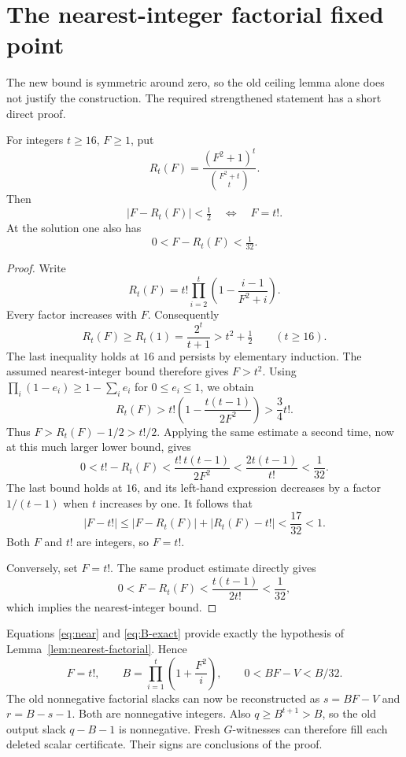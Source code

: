 \section{The nearest-integer factorial fixed point}

The new bound is symmetric around zero, so the old ceiling lemma alone
does not justify the construction. The required strengthened statement
has a short direct proof.

\begin{lemma}\label{lem:nearest-factorial}
For integers \(t\ge16\), \(F\ge1\), put
\[
 R_t(F)=\frac{(F^2+1)^t}{\binom{F^2+t}{t}}.
\]
Then
\[
 |F-R_t(F)|<\tfrac12\quad\Longleftrightarrow\quad F=t!.
\]
At the solution one also has
\[
 0<F-R_t(F)<\tfrac1{32}.
\]
\end{lemma}

\begin{proof}
Write
\[
 R_t(F)=t!\prod_{i=2}^t
       \left(1-\frac{i-1}{F^2+i}\right).
\]
Every factor increases with \(F\). Consequently
\[
 R_t(F)\ge R_t(1)=\frac{2^t}{t+1}>t^2+\tfrac12
       \qquad(t\ge16).
\]
The last inequality holds at \(16\) and persists by elementary
induction. The assumed nearest-integer bound therefore gives \(F>t^2\).
Using \(\prod_i(1-e_i)\ge1-\sum_i e_i\) for \(0\le e_i\le1\),
we obtain
\[
 R_t(F)>
 t!\left(1-\frac{t(t-1)}{2F^2}\right)>\frac34t!.
\]
Thus \(F>R_t(F)-1/2>t!/2\). Applying the same estimate a second
time, now at this much larger lower bound, gives
\[
 0<t!-R_t(F)<\frac{t!\,t(t-1)}{2F^2}
                 <\frac{2t(t-1)}{t!}<\frac1{32}.
\]
The last bound holds at \(16\), and its left-hand expression decreases
by a factor \(1/(t-1)\) when \(t\) increases by one.
It follows that
\[
 |F-t!|\le |F-R_t(F)|+|R_t(F)-t!|<\frac{17}{32}<1.
\]
Both \(F\) and \(t!\) are integers, so \(F=t!\).

Conversely, set \(F=t!\). The same product estimate directly gives
\[
 0<F-R_t(F)<\frac{t(t-1)}{2t!}<\frac1{32},
\]
which implies the nearest-integer bound.
\end{proof}

Equations \eqref{eq:near} and \eqref{eq:B-exact} provide exactly
the hypothesis of Lemma~\ref{lem:nearest-factorial}. Hence
\begin{equation}\label{eq:factorial-recovered}
 F=t!,\qquad
 B=\prod_{i=1}^t\left(1+\frac{F^2}{i}\right),\qquad
 0<BF-V<B/32.
\end{equation}
The old nonnegative factorial slacks can now be reconstructed as
\(s=BF-V\) and \(r=B-s-1\). Both are nonnegative integers.
Also \(q\ge B^{t+1}>B\), so the old output slack \(q-B-1\)
is nonnegative. Fresh \(G\)-witnesses can therefore fill each
deleted scalar certificate. Their signs are conclusions of the proof.

